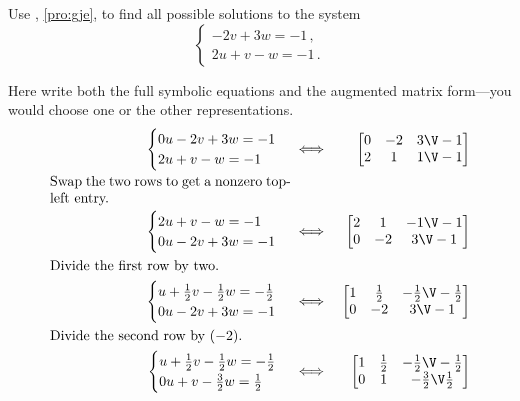 \begin{example} \label{eg:gjeb}
Use , \cref{pro:gje}, to find all possible solutions to the  system
\begin{equation*}
\begin{cases}
-2v+3w=-1\,,\\2u+v-w=-1\,.
\end{cases}
\end{equation*}

\begin{solution} 
Here write both the full symbolic equations and the augmented matrix form---you would choose one or the other representations.
\begin{eqnarray*}
\begin{cases}
0u-2v+3w=-1\\2u+v-w=-1
\end{cases}
&\iff&%
\begin{bmatrix} 0&-2&3\V-1\\2&1&1\V-1 \end{bmatrix}
\\
\parbox{0.5\linewidth}{Swap the two rows to get a nonzero top-left entry.}
\\
\begin{cases}
2u+v-w=-1\\0u-2v+3w=-1
\end{cases}
&\iff&%
\begin{bmatrix} 2&1&-1\V-1\\0&-2&3\V-1 \end{bmatrix}
\\
\parbox{0.5\linewidth}{Divide the first row by two.}
\\
\begin{cases}
u+\frac12v-\frac12w=-\frac12\\0u-2v+3w=-1
\end{cases}
&\iff&%
\begin{bmatrix} 1&\frac12&-\frac12\V-\frac12\\0&-2&3\V-1 \end{bmatrix}
\\
\parbox{0.5\linewidth}{Divide the second row by~\((-2)\).}
\\
\begin{cases}
u+\frac12v-\frac12w=-\frac12\\0u+v-\frac32w=\frac12
\end{cases}
&\iff&%
\begin{bmatrix} 1&\frac12&-\frac12\V-\frac12\\0&1&-\frac32\V\frac12 \end{bmatrix}

\end{eqnarray*}
\end{solution}
\end{example}

